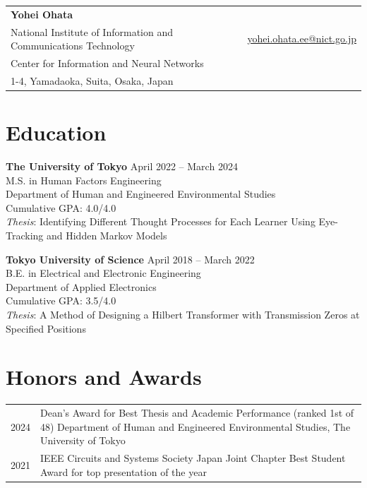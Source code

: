\documentclass[letterpaper,10.5pt]{article}
\begin{document}
\begin{tabularx}{\textwidth}{@{}X r@{}}
{\LARGE \textbf{Yohei Ohata}} \\
\noalign{\vspace{3pt}}
National Institute of Information and Communications Technology & \href{mailto:yohei.ohata.ee@nict.go.jp}{yohei.ohata.ee@nict.go.jp} \\
Center for Information and Neural Networks & \\
1-4, Yamadaoka, Suita, Osaka, Japan & \\
\end{tabularx}

\vspace{5pt}

\section*{Education}
\textbf{The University of Tokyo} \hfill April 2022 -- March 2024 \\
M.S. in Human Factors Engineering \\
Department of Human and Engineered Environmental Studies \\
Cumulative GPA: 4.0/4.0 \\
{\small \textit{Thesis}: Identifying Different Thought Processes for Each Learner Using Eye-Tracking and Hidden Markov Models} \\

\par\vspace{2pt}
\textbf{Tokyo University of Science} \hfill April 2018 -- March 2022 \\
B.E. in Electrical and Electronic Engineering \\
Department of Applied Electronics \\
Cumulative GPA: 3.5/4.0 \\
{\small \textit{Thesis}: A Method of Designing a Hilbert Transformer with Transmission Zeros at Specified Positions} \\

\par\vspace{2pt}
\section*{Honors and Awards}
\begin{tabularx}{\textwidth}{@{}p{0.8cm} X@{}}
2024 & Dean's Award for Best Thesis and Academic Performance (ranked 1st of 48) \newline Department of Human and Engineered Environmental Studies, The University of Tokyo \\ 
2021 & IEEE Circuits and Systems Society Japan Joint Chapter Best Student Award \newline for top presentation of the year \\ 
\end{tabularx}
\end{document}
